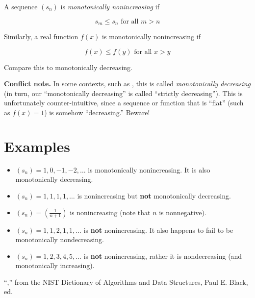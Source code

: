 \documentclass[12pt]{article}
\begin{document}
A sequence $(s_n)$ is \emph{monotonically nonincreasing} if 

$$ s_m \le s_n \text{ for all } m > n $$

Similarly, a real function $f(x)$ is monotonically nonincreasing if 

$$ f(x) \le f(y) \text{ for all } x > y $$

Compare this to monotonically decreasing.

\textbf{Conflict note.} In some contexts, such as \cite{NIST}, this is called \emph{monotonically decreasing} (in turn, our ``monotonically decreasing'' is called ``strictly decreasing'').  This is unfortunately counter-intuitive, since a sequence or function that is ``flat'' (such as $f(x) = 1$) is somehow ``decreasing.''  Beware!

\section{Examples}

\begin{itemize}

\item $(s_n) = 1, 0, -1, -2, \ldots$ is monotonically nonincreasing.  It is also monotonically decreasing.

\item $(s_n) = 1, 1, 1, 1, \ldots$ is nonincreasing but {\bf not} monotonically decreasing.

\item $(s_n) = (\frac{1}{n+1})$  is nonincreasing (note that $n$ is nonnegative).

\item $(s_n) = 1, 1, 2, 1, 1, \ldots$ is {\bf not} nonincreasing.  It also happens to fail to be monotonically nondecreasing.

\item $(s_n) = 1, 2, 3, 4, 5, \ldots$ is {\bf not} nonincreasing, rather it is nondecreasing (and monotonically increasing).

\end{itemize}

\begin{thebibliography}{3}
 ``,'' from the NIST Dictionary of Algorithms and Data Structures, Paul E. Black, ed.
\end{thebibliography}
\end{document}
